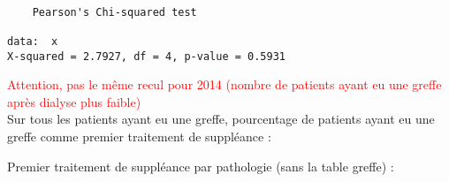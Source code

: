 \documentclass[11pt,a4paper]{article}\usepackage[]{graphicx}\usepackage[]{color}
\makeatletter
\newenvironment{kframe}{%
 \def\at@end@of@kframe{}%
 \ifinner\ifhmode%
  \def\at@end@of@kframe{\end{minipage}}%
  \begin{minipage}{\columnwidth}%
 \fi\fi%
 \def\FrameCommand##1{\hskip\@totalleftmargin \hskip-\fboxsep
 \colorbox{shadecolor}{##1}\hskip-\fboxsep
     \hskip-\linewidth \hskip-\@totalleftmargin \hskip\columnwidth}%
 \MakeFramed {\advance\hsize-\width
   \@totalleftmargin\z@ \linewidth\hsize
   \@setminipage}}%
 {\par\unskip\endMakeFramed%
 \at@end@of@kframe}
\newenvironment{knitrout}{}{} %
\makeatother
\begin{document}
\begin{knitrout}
\color{fgcolor}\begin{kframe}
\begin{verbatim}

	Pearson's Chi-squared test

data:  x
X-squared = 2.7927, df = 4, p-value = 0.5931
\end{verbatim}
\end{kframe}
\end{knitrout}

\textcolor{red}{Attention, pas le même recul pour 2014 (nombre de patients ayant eu une greffe après dialyse plus faible)}
~\\

Sur tous les patients ayant eu une greffe, pourcentage de patients ayant eu une greffe comme premier traitement de suppléance :


Premier traitement de suppléance par pathologie (sans la table greffe) :
\end{document}
